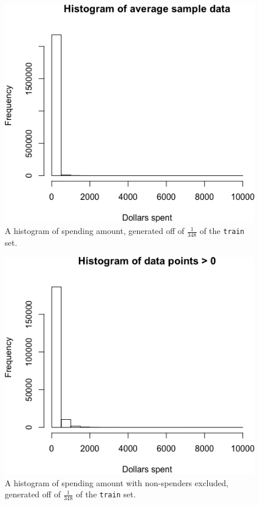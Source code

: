 \documentclass{article}
\begin{document}
\begin{figure}[H]
\begin{center}
	\includegraphics[width=.8 \linewidth]{all-hist.png}
\end{center}
  \vspace{-1em}
  \caption{A histogram of spending amount, generated off of $\frac{1}{348}$ of the \texttt{train} set.}
  \label{fig:spend}
\end{figure}

\begin{figure}[H]
\begin{center}
	\includegraphics[width=.8 \linewidth]{hist-gt-0.png}
\end{center}
  \vspace{-1em}
  \caption{A histogram of spending amount with non-spenders excluded, generated off of $\frac{1}{348}$ of the \texttt{train} set.}
  \label{fig:spend-non}
\end{figure}
\end{document}
